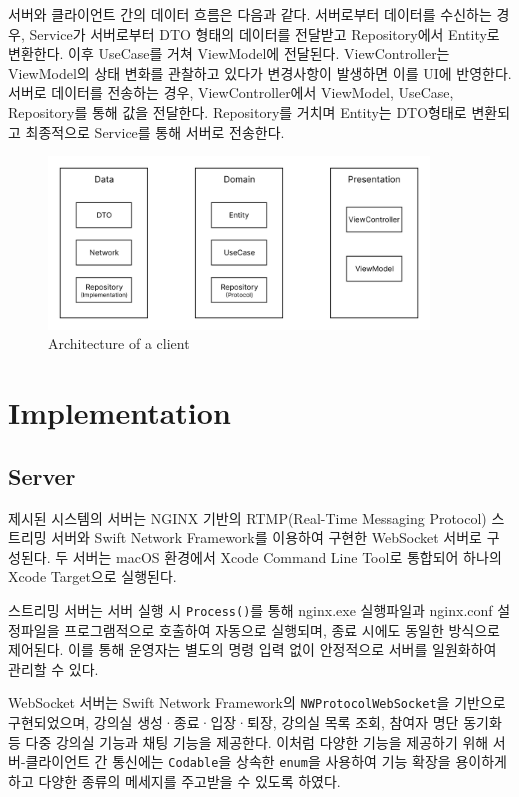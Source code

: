 \documentclass[pdflatex,sn-mathphys-num]{sn-jnl}%
\theoremstyle{thmstyleone}%
\theoremstyle{thmstyletwo}%
\theoremstyle{thmstylethree}%
\begin{document}
서버와 클라이언트 간의 데이터 흐름은 다음과 같다.
서버로부터 데이터를 수신하는 경우, Service가 서버로부터 DTO 형태의 데이터를 전달받고 Repository에서 Entity로 변환한다. 이후 UseCase를 거쳐 ViewModel에 전달된다. ViewController는 ViewModel의 상태 변화를 관찰하고 있다가 변경사항이 발생하면 이를 UI에 반영한다.
서버로 데이터를 전송하는 경우, ViewController에서 ViewModel, UseCase, Repository를 통해 값을 전달한다. Repository를 거치며 Entity는 DTO형태로 변환되고 최종적으로 Service를 통해 서버로 전송한다.

\begin{figure}[H]
\centering
\includegraphics[width=0.9\textwidth]{architecture_of_client.png}
\caption{Architecture of a client}\label{fig2}
\end{figure}

\section{Implementation}\label{sec3}

\subsection{Server}\label{subsec3}

제시된 시스템의 서버는 NGINX 기반의 RTMP(Real-Time Messaging Protocol)\cite{RTMP} 스트리밍 서버와 Swift Network Framework를 이용하여 구현한 WebSocket 서버로 구성된다. 두 서버는 macOS 환경에서 Xcode Command Line Tool로 통합되어 하나의 Xcode Target으로 실행된다.

스트리밍 서버는 서버 실행 시 \verb+Process()+를 통해 nginx.exe 실행파일과 nginx.conf 설정파일을 프로그램적으로 호출하여 자동으로 실행되며, 종료 시에도 동일한 방식으로 제어된다. 이를 통해 운영자는 별도의 명령 입력 없이 안정적으로 서버를 일원화하여 관리할 수 있다.

WebSocket 서버는 Swift Network Framework\cite{Network}의 \verb+NWProtocolWebSocket+을 기반으로 구현되었으며, 강의실 생성·종료·입장·퇴장, 강의실 목록 조회, 참여자 명단 동기화 등 다중 강의실 기능과 채팅 기능을 제공한다. 이처럼 다양한 기능을 제공하기 위해 서버-클라이언트 간 통신에는 \verb+Codable+을 상속한 \verb+enum+을 사용하여 기능 확장을 용이하게 하고 다양한 종류의 메세지를 주고받을 수 있도록 하였다.
\end{document}
